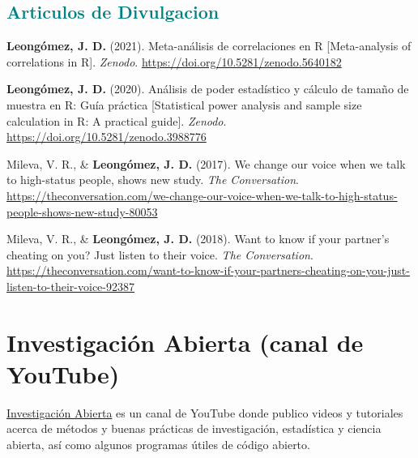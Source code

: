 \documentclass[11pt, a4paper]{awesome-cv}
\begin{document}
\hypertarget{section-2}{%
\subsection{\texorpdfstring{\textcolor{teal}{Articulos de Divulgacion}}{}}\label{section-2}}

\begingroup
\setlength{\parindent}{-0.5in}
\setlength{\leftskip}{0.5in}

\hypertarget{refs_divulgation}{}
\leavevmode{}%
\textbf{Leongómez, J. D.} (2021). {Meta-análisis de correlaciones en R
{[}Meta-analysis of correlations in R{]}}. \emph{Zenodo}.
\url{https://doi.org/10.5281/zenodo.5640182}

\leavevmode{}%
\textbf{Leongómez, J. D.} (2020). {Análisis de poder estadístico y
cálculo de tamaño de muestra en R: Guía práctica {[}Statistical power
analysis and sample size calculation in R: A practical guide{]}}.
\emph{Zenodo}. \url{https://doi.org/10.5281/zenodo.3988776}

\leavevmode{}%
Mileva, V. R., \& \textbf{Leongómez, J. D.} (2017). {We change our voice
when we talk to high-status people, shows new study}. \emph{The
Conversation}.
\url{https://theconversation.com/we-change-our-voice-when-we-talk-to-high-status-people-shows-new-study-80053}

\leavevmode{}%
Mileva, V. R., \& \textbf{Leongómez, J. D.} (2018). {Want to know if
your partner's cheating on you? Just listen to their voice}. \emph{The
Conversation}.
\url{https://theconversation.com/want-to-know-if-your-partners-cheating-on-you-just-listen-to-their-voice-92387}

\endgroup

\hypertarget{investigaciuxf3n-abierta-canal-de-youtube}{%
\section{Investigación Abierta (canal de
YouTube)}\label{investigaciuxf3n-abierta-canal-de-youtube}}

\href{https://www.youtube.com/c/InvestigaciónAbierta}{\textcolor{red}{\faYoutubePlay}
Investigación Abierta} es un canal de YouTube donde publico videos y
tutoriales acerca de métodos y buenas prácticas de investigación,
estadística y ciencia abierta, así como algunos programas útiles de
código abierto.

\begingroup
\setlength{\parindent}{-0.5in}
\setlength{\leftskip}{0.5in}
\end{document}
